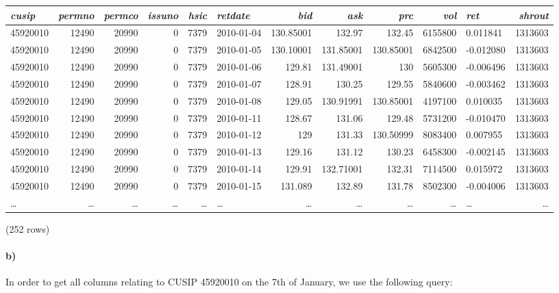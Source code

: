 \documentclass[]{article}
\let\oldparagraph\paragraph
\renewcommand{\paragraph}[1]{\oldparagraph{#1}\mbox{}}
\begin{document}
\begin{adjustbox}{width=1.2\linewidth,totalheight=4in, center}
\begin{tabular}{|l | r | r | r | r | l | r | r | r | r | l | r|}
\hline
\textit{cusip} & \textit{permno} & \textit{permco} & \textit{issuno} & \textit{hsic} & \textit{retdate} & \textit{bid} & \textit{ask} & \textit{prc} & \textit{vol} & \textit{ret} & \textit{shrout} \\
\hline
45920010 & 12490 & 20990 & 0 & 7379 & 2010-01-04 & 130.85001 & 132.97 & 132.45 & 6155800 & 0.011841 & 1313603 \\
45920010 & 12490 & 20990 & 0 & 7379 & 2010-01-05 & 130.10001 & 131.85001 & 130.85001 & 6842500 & -0.012080 & 1313603 \\
45920010 & 12490 & 20990 & 0 & 7379 & 2010-01-06 & 129.81 & 131.49001 & 130 & 5605300 & -0.006496 & 1313603 \\
45920010 & 12490 & 20990 & 0 & 7379 & 2010-01-07 & 128.91 & 130.25 & 129.55 & 5840600 & -0.003462 & 1313603 \\
45920010 & 12490 & 20990 & 0 & 7379 & 2010-01-08 & 129.05 & 130.91991 & 130.85001 & 4197100 & 0.010035 & 1313603 \\
45920010 & 12490 & 20990 & 0 & 7379 & 2010-01-11 & 128.67 & 131.06 & 129.48 & 5731200 & -0.010470 & 1313603 \\
45920010 & 12490 & 20990 & 0 & 7379 & 2010-01-12 & 129 & 131.33 & 130.50999 & 8083400 & 0.007955 & 1313603 \\
45920010 & 12490 & 20990 & 0 & 7379 & 2010-01-13 & 129.16 & 131.12 & 130.23 & 6458300 & -0.002145 & 1313603 \\
45920010 & 12490 & 20990 & 0 & 7379 & 2010-01-14 & 129.91 & 132.71001 & 132.31 & 7114500 & 0.015972 & 1313603 \\
45920010 & 12490 & 20990 & 0 & 7379 & 2010-01-15 & 131.089 & 132.89 & 131.78 & 8502300 & -0.004006 & 1313603 \\
\ldots & \ldots & \ldots & \ldots & \ldots & \ldots & \ldots & \ldots & \ldots & \ldots & \ldots & \ldots \\
\hline
\end{tabular}
\end{adjustbox}

\begin{center}
\noindent (252 rows) \\
\end{center}

\paragraph{b)}
In order to get all columns relating to CUSIP 45920010 on the 7th of January, we use the following query:
\end{document}
